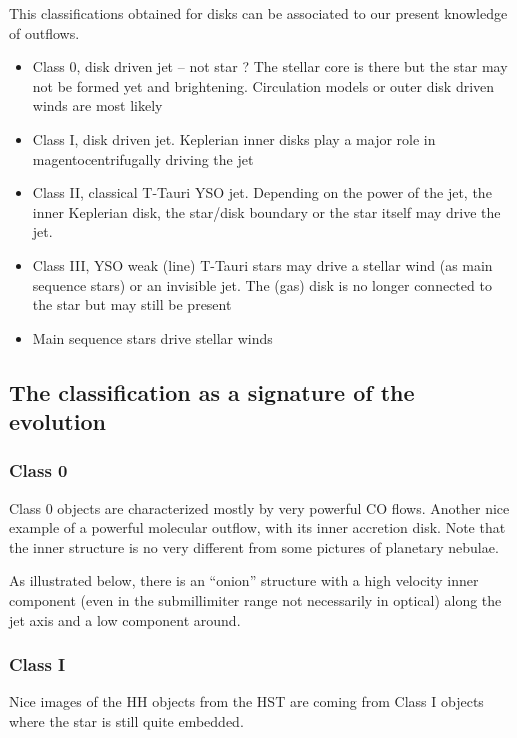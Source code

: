 \documentclass[10pt,a4paper,english,draft]{article}
\begin{document}
This classifications obtained for disks can be associated to our present knowledge of outflows.
\begin{itemize}
\item Class 0, disk driven jet -- not star ? The stellar core is there but the star may not be formed yet and brightening. Circulation models or outer disk driven winds are most likely
\item Class I, disk driven jet. Keplerian inner disks play a major role in magentocentrifugally driving the jet
\item Class II, classical T-Tauri YSO jet. Depending on the power of the jet, the inner Keplerian disk, the star/disk boundary or the star itself may drive the jet.
\item Class III, YSO weak (line) T-Tauri stars may drive a stellar wind (as main sequence stars) or an invisible jet. The (gas) disk is no longer connected to the star but may still be present
\item Main sequence stars drive stellar winds
\end{itemize}

\subsection{The classification as a signature of the evolution}

\subsubsection{Class 0}

Class 0 objects are characterized mostly by very powerful CO flows. Another nice example of a powerful molecular outflow, with its inner accretion disk. Note that the inner structure is no very different from some pictures of planetary nebulae.


As illustrated below, there is an ``onion'' structure with a high velocity inner component (even in the submillimiter range not necessarily in optical) along the jet axis and a low component around.

\subsubsection{Class I}

Nice images of the HH objects from the HST are coming from Class I objects where the star is still quite embedded.
\end{document}

